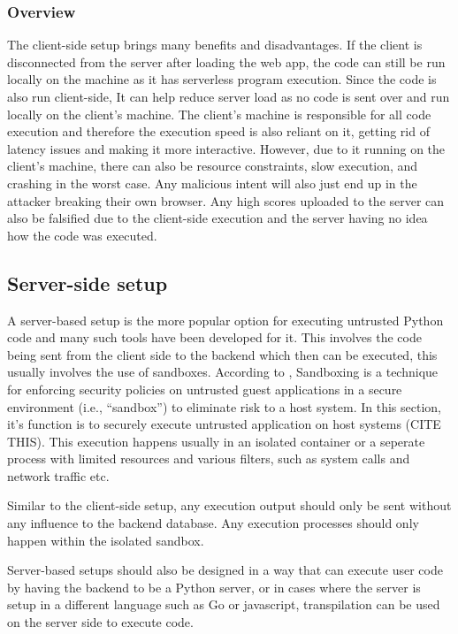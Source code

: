 \subsubsection{Overview}
The client-side setup brings many benefits and disadvantages. If the client is disconnected from the server after loading the web app, the code can still be run locally on the machine as it has serverless program execution. Since the code is also run client-side, It can help reduce server load as no code is sent over and run locally on the client's machine. The client's machine is responsible for all code execution and therefore the execution speed is also reliant on it, getting rid of latency issues and making it more interactive. However, due to it running on the client's machine, there can also be resource constraints, slow execution, and crashing in the worst case. Any malicious intent will also just end up in the attacker breaking their own browser. Any high scores uploaded to the server can also be falsified due to the client-side execution and the server having no idea how the code was executed.

\subsection{Server-side setup}
A server-based setup is the more popular option for executing untrusted Python code and many such tools have been developed for it. This involves the code being sent from the client side to the backend which then can be executed, this usually involves the use of sandboxes. According to \cite{stephens2024sandbox}, Sandboxing is a technique for enforcing security policies on untrusted guest applications in a secure environment (i.e., “sandbox”) to eliminate risk to a host system. In this section, it's function is to securely execute untrusted application on host systems (CITE THIS). This execution happens usually in an isolated container or a seperate process with limited resources and various filters, such as system calls and network traffic etc.

Similar to the client-side setup, any execution output should only be sent without any influence to the backend database. Any execution processes should only happen within the isolated sandbox.

Server-based setups should also be designed in a way that can execute user code by having the backend to be a Python server, or in cases where the server is setup in a different language such as Go or javascript, transpilation can be used on the server side to execute code.

